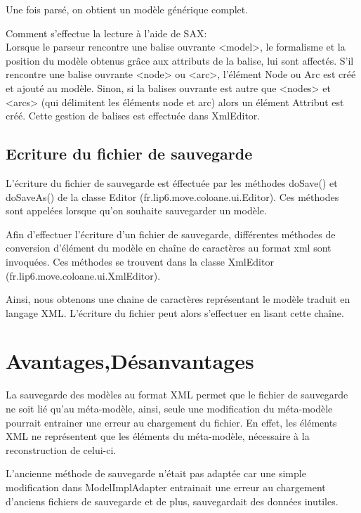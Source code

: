 \documentclass{article}
\begin{document}
Une fois pars\'e, on obtient un mod\`ele g\'en\'erique complet.

Comment s'effectue la lecture \`a l'aide de SAX:\\

Lorsque le parseur rencontre une balise ouvrante <model>, le formalisme et la position du mod\`ele obtenus gr\^ace aux attributs de la balise, lui sont affect\'es.
S'il rencontre une balise ouvrante <node> ou <arc>, l'\'el\'ement Node ou Arc est cr\'e\'e et ajout\'e au mod\`ele.
Sinon, si la balises ouvrante est autre que <nodes> et <arcs> (qui d\'elimitent les \'el\'ements node et arc) alors un \'el\'ement Attribut est cr\'e\'e.
Cette gestion de balises est effectu\'ee dans XmlEditor.



\subsection{Ecriture du fichier de sauvegarde}
L'\'ecriture du fichier de sauvegarde est \'effectu\'ee par les m\'ethodes doSave() et doSaveAs() de la classe Editor (fr.lip6.move.coloane.ui.Editor).
Ces m\'ethodes sont appel\'ees lorsque qu'on souhaite sauvegarder un mod\`ele.

Afin d'effectuer l'\'ecriture d'un fichier de sauvegarde, diff\'erentes m\'ethodes de conversion d'\'el\'ement du mod\`ele en chaîne de caract\`eres au format xml sont invoqu\'ees.
Ces m\'ethodes se trouvent dans la classe XmlEditor (fr.lip6.move.coloane.ui.XmlEditor).

Ainsi, nous obtenons une chaine de caract\`eres repr\'esentant le mod\`ele traduit en langage XML.
L'\'ecriture du fichier peut alors s'effectuer en lisant cette chaîne.

\section{Avantages,D\'esanvantages}

La sauvegarde des mod\`eles au format XML permet que le fichier de sauvegarde ne soit li\'e qu'au m\'eta-mod\`ele, ainsi, seule une modification du m\'eta-mod\`ele pourrait entrainer une erreur au chargement du fichier.
En effet, les \'el\'ements XML ne repr\'esentent que les \'el\'ements du m\'eta-mod\`ele, n\'ecessaire \`a la reconstruction de celui-ci.

L'ancienne m\'ethode de sauvegarde n'\'etait pas adapt\'ee car une simple modification dans ModelImplAdapter entrainait une erreur au chargement d'anciens fichiers de sauvegarde et de plus, sauvegardait des donn\'ees inutiles.
\end{document}
